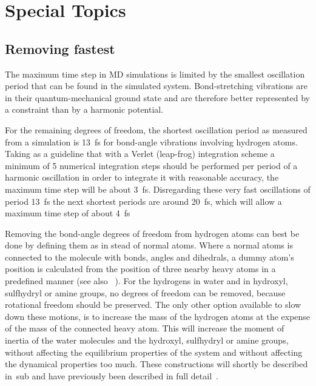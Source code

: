 \chapter{Special Topics}
\label{ch:special}

\newcommand{\amine}{\sf -NH$_2$}
\newcommand{\amines}{\sf -NH-}
\newcommand{\aminep}{\sf -NH$_3^+$}
\section{Removing fastest }
The maximum time step in MD simulations is limited by the smallest
oscillation period that can be found in the simulated
system. Bond-stretching vibrations are in their quantum-mechanical
ground state and are therefore better represented by a constraint than
by a harmonic potential.

For the remaining degrees of freedom, the shortest oscillation period
as measured from a simulation is 13~fs for bond-angle vibrations
involving hydrogen atoms. Taking as a guideline that with a Verlet
(leap-frog) integration scheme a minimum of 5 numerical integration
steps should be performed per period of a harmonic oscillation in
order to integrate it with reasonable accuracy, the maximum time step
will be about 3~fs. Disregarding these very fast oscillations of
period 13~fs the next shortest periods are around 20~fs, which will
allow a maximum time step of about 4~fs

Removing the bond-angle degrees of freedom from hydrogen atoms can
best be done by defining them as  in stead of
normal atoms. Where a normal atoms is connected to the molecule with
bonds, angles and dihedrals, a dummy atom's position is calculated
from the position of three nearby heavy atoms in a predefined manner
(see also ~). For the hydrogens in water and in
hydroxyl, sulfhydryl or amine groups, no degrees of freedom can be
removed, because rotational freedom should be preserved. The only
other option available to slow down these motions, is to increase the
mass of the hydrogen atoms at the expense of the mass of the connected
heavy atom. This will increase the moment of inertia of the water
molecules and the hydroxyl, sulfhydryl or amine groups, without
affecting the equilibrium properties of the system and without
affecting the dynamical properties too much. These constructions will
shortly be described in~sub and have previously
been described in full detail~\cite{feenstra99}.

